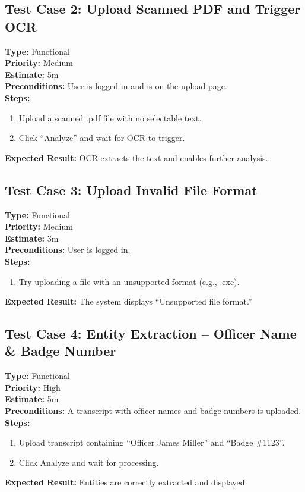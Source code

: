 \documentclass[12pt]{article}
\begin{document}
\subsection*{Test Case 2: Upload Scanned PDF and Trigger OCR}
\textbf{Type:} Functional \\
\textbf{Priority:} Medium \\
\textbf{Estimate:} 5m \\
\textbf{Preconditions:} User is logged in and is on the upload page. \\
\textbf{Steps:}
\begin{enumerate}[label=\arabic*.]
\item Upload a scanned .pdf file with no selectable text.
\item Click “Analyze” and wait for OCR to trigger.
\end{enumerate}
\textbf{Expected Result:} OCR extracts the text and enables further analysis.

\subsection*{Test Case 3: Upload Invalid File Format}
\textbf{Type:} Functional \\
\textbf{Priority:} Medium \\
\textbf{Estimate:} 3m \\
\textbf{Preconditions:} User is logged in. \\
\textbf{Steps:}
\begin{enumerate}[label=\arabic*.]
\item Try uploading a file with an unsupported format (e.g., .exe).
\end{enumerate}
\textbf{Expected Result:} The system displays “Unsupported file format.”

\subsection*{Test Case 4: Entity Extraction – Officer Name \& Badge Number}
\textbf{Type:} Functional \\
\textbf{Priority:} High \\
\textbf{Estimate:} 5m \\
\textbf{Preconditions:} A transcript with officer names and badge numbers is uploaded. \\
\textbf{Steps:}
\begin{enumerate}[label=\arabic*.]
\item Upload transcript containing “Officer James Miller” and “Badge \#1123”.
\item Click Analyze and wait for processing.
\end{enumerate}
\textbf{Expected Result:} Entities are correctly extracted and displayed.
\end{document}
